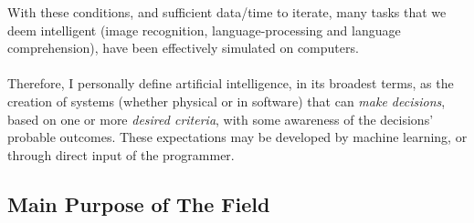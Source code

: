 \documentclass[10pt,a4paper]{article}
\begin{document}
				With these conditions, and sufficient data/time to iterate, many tasks that we deem intelligent (image recognition, language-processing and language comprehension), have been effectively simulated on computers.
				\\\\
				Therefore, I personally define artificial intelligence, in its broadest terms, as the creation of systems (whether physical or in software) that can \textsl{make decisions}, based on one or more \textsl{desired criteria}, with some awareness of the decisions' probable outcomes. These expectations may be developed by machine learning, or through direct input of the programmer.
		
			\subsection{Main Purpose of The Field}
		
\end{document}
